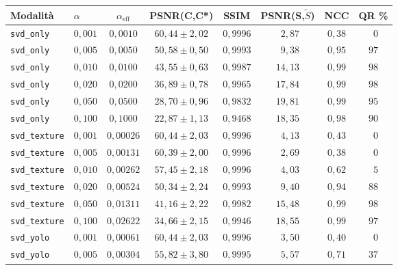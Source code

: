 \documentclass[11pt,a4paper]{article}
\theoremstyle{definition}
\theoremstyle{remark}
\begin{document}
\begin{table}[H]\centering\small
\begin{tabular}{llcccccc}
\toprule
\textbf{Modalit\`a} & $\alpha$ & $\alpha_{\text{eff}}$ &
\textbf{PSNR(C,C*)} & \textbf{SSIM} &
\textbf{PSNR(S,$\tilde S$)} & \textbf{NCC} & \textbf{QR \%}\\
\midrule
\verb|svd_only|    & $0{,}001$ & $0{,}0010$  & $60{,}44 \pm 2{,}02$ & $0{,}9996$ & $\phantom{0}2{,}87$ & $0{,}38$ & $\phantom{0}0$ \\
\verb|svd_only|    & $0{,}005$ & $0{,}0050$  & $50{,}58 \pm 0{,}50$ & $0{,}9993$ & $\phantom{0}9{,}38$ & $0{,}95$ & $97$ \\
\verb|svd_only|    & $0{,}010$ & $0{,}0100$  & $43{,}55 \pm 0{,}63$ & $0{,}9987$ & $14{,}13$           & $0{,}99$ & $98$ \\
\verb|svd_only|    & $0{,}020$ & $0{,}0200$  & $36{,}89 \pm 0{,}78$ & $0{,}9965$ & $17{,}84$           & $0{,}99$ & $98$ \\
\verb|svd_only|    & $0{,}050$ & $0{,}0500$  & $28{,}70 \pm 0{,}96$ & $0{,}9832$ & $19{,}81$           & $0{,}99$ & $95$ \\
\verb|svd_only|    & $0{,}100$ & $0{,}1000$  & $22{,}87 \pm 1{,}13$ & $0{,}9468$ & $18{,}35$           & $0{,}98$ & $90$ \\
\midrule
\verb|svd_texture| & $0{,}001$ & $0{,}00026$ & $60{,}44 \pm 2{,}03$ & $0{,}9996$ & $\phantom{0}4{,}13$ & $0{,}43$ & $\phantom{0}0$ \\
\verb|svd_texture| & $0{,}005$ & $0{,}00131$ & $60{,}39 \pm 2{,}00$ & $0{,}9996$ & $\phantom{0}2{,}69$ & $0{,}38$ & $\phantom{0}0$ \\
\verb|svd_texture| & $0{,}010$ & $0{,}00262$ & $57{,}45 \pm 2{,}18$ & $0{,}9996$ & $\phantom{0}4{,}03$ & $0{,}62$ & $\phantom{0}5$ \\
\verb|svd_texture| & $0{,}020$ & $0{,}00524$ & $50{,}34 \pm 2{,}24$ & $0{,}9993$ & $\phantom{0}9{,}40$ & $0{,}94$ & $88$ \\
\verb|svd_texture| & $0{,}050$ & $0{,}01311$ & $41{,}16 \pm 2{,}22$ & $0{,}9982$ & $15{,}48$           & $0{,}99$ & $98$ \\
\verb|svd_texture| & $0{,}100$ & $0{,}02622$ & $34{,}66 \pm 2{,}15$ & $0{,}9946$ & $18{,}55$           & $0{,}99$ & $97$ \\
\midrule
\verb|svd_yolo|    & $0{,}001$ & $0{,}00061$ & $60{,}44 \pm 2{,}03$ & $0{,}9996$ & $\phantom{0}3{,}50$ & $0{,}40$ & $\phantom{0}0$ \\
\verb|svd_yolo|    & $0{,}005$ & $0{,}00304$ & $55{,}82 \pm 3{,}80$ & $0{,}9995$ & $\phantom{0}5{,}57$ & $0{,}71$ & $37$ \\

\end{tabular}
\end{table}
\end{document}
